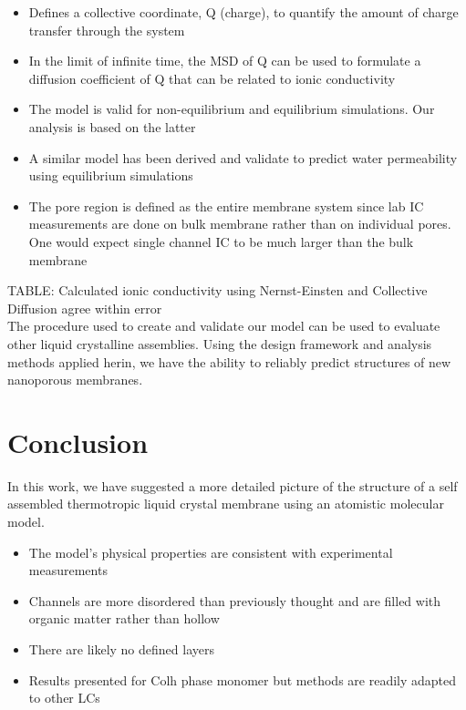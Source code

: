\documentclass{article}
\begin{document}
\begin{itemize}
		\begin{itemize}
			\item Defines a collective coordinate, Q (charge), to quantify the amount of charge transfer through the system
			\item In the limit of infinite time, the MSD of Q can be used to formulate a diffusion coefficient of Q that can be related to ionic conductivity
			\item The model is valid for non-equilibrium and equilibrium simulations. Our analysis is based on the latter
			\item A similar model has been derived and validate to predict water permeability using equilibrium simulations
			\item The pore region is defined as the entire membrane system since lab IC measurements are done on bulk membrane rather than on individual pores. One would expect single channel IC to be much larger than the bulk membrane
		\end{itemize}                    
	\end{itemize}
	TABLE: Calculated ionic conductivity using Nernst-Einsten and Collective Diffusion agree within error
	\\

	The procedure used to create and validate our model can be used to evaluate other liquid crystalline assemblies. Using the design framework and analysis methods applied herin, we have the ability to reliably predict structures of new nanoporous membranes.
	
	\section{Conclusion}
	
	In this work, we have suggested a more detailed picture of the structure of a self assembled thermotropic liquid crystal membrane using an atomistic molecular model.
	\begin{itemize}
		\item The model's physical properties are consistent with experimental measurements
		\item Channels are more disordered than previously thought and are filled with organic matter rather than hollow 
		\item There are likely no defined layers
		\item Results presented for Colh phase monomer but methods are readily adapted to other LCs
	\end{itemize}
	
\end{document}
